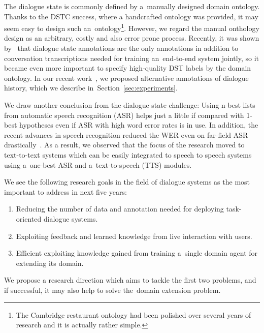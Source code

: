 \documentclass[11pt]{article}
\begin{document}
The dialogue state is commonly defined by a~manually designed domain ontology.
Thanks to the DSTC success, where a handcrafted ontology was provided, it may seem easy to design such an~ontology\footnote{The Cambridge restaurant ontology had been polished over several years of research and it is actually rather simple.}.
However, we regard the manual onthology design as an arbitrary, costly and also error prone process.
Recently, it was shown by~\cite{wen_networkbased_2016} that dialogue state annotations are the only annotations in addition to conversation transcriptions needed for training an~end-to-end system jointly, so it became even more important to specify high-quality DST labels by the domain ontology.
In our recent work~\cite{platek2016wochat}, we proposed alternative annotations of dialogue history, which we describe in~Section~\ref{sec:experiments}.

We draw another conclusion from the dialogue state challenge: Using n-best lists from automatic speech recognition (ASR) helps just a little if compared with 1-best hypotheses even if ASR with high word error rates is in use.
In addition, the recent advances in speech recognition reduced the WER even on far-field ASR drastically~\cite{peddinti_jhu_2015,zhang_highway_2016}.
As a result, we observed that the focus of the research moved to text-to-text systems which can be easily integrated to speech to speech systems using a~one-best ASR and a~text-to-speech (TTS) modules.

We see the following research goals in the field of dialogue systems as the most important to address in next five years:
\begin{enumerate}
    \item Reducing the number of data and annotation needed for deploying task-oriented dialogue systems.
    \item Exploiting feedback and learned knowledge from live interaction with users.
    \item Efficient exploiting knowledge gained from training a~single domain agent for extending its domain. 
\end{enumerate}

We propose a research direction which aims to tackle the first two problems, and if successful, it may also help to solve the~domain extension problem.
\end{document}
